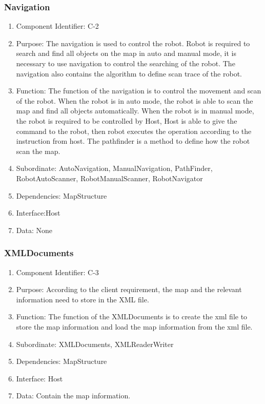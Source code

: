 \documentclass[11pt, a4paper]{report}
\begin{document}
\subsubsection{Navigation}
\begin{enumerate}
\item Component Identifier: C-2
\item Purpose: The navigation is used to control the robot. Robot is required to search and find all objects on the map in auto and manual mode, it is necessary to use navigation to control the searching of the robot. The navigation also contains the algorithm to define scan trace of the robot. 
\item Function: The function of the navigation is to control the movement and scan of the robot. When the robot is in auto mode, the robot is able to scan the map and find all objects automatically. When the robot is in manual mode, the robot is required to be controlled by Host, Host is able to give the command to the robot, then robot executes the operation according to the instruction from host. The pathfinder is a method to define how the robot scan the map. 
\item Subordinate: AutoNavigation, ManualNavigation, PathFinder, RobotAutoScanner, RobotManualScanner, RobotNavigator
\item Dependencies: MapStructure
\item Interface:Host
\item Data: None
\end{enumerate}

\subsubsection{XMLDocuments}
\begin{enumerate}
\item Component Identifier: C-3
\item Purpose: According to the client requirement, the map and the relevant information need to store in the XML file. 
\item Function: The function of the XMLDocuments is to create the xml file to store the map information and load the map information from the xml file. 
\item Subordinate: XMLDocuments, XMLReaderWriter
\item Dependencies: MapStructure
\item Interface: Host
\item Data: Contain the map information.
\end{enumerate}
\end{document}

